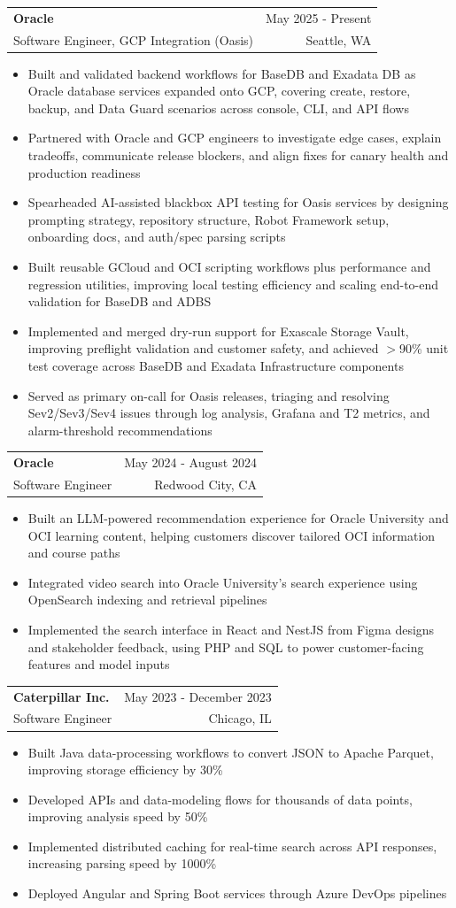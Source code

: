 \documentclass[letterpaper,11pt]{article}
\makeatletter
\newcommand{\resumeItem}[1]{
  \item\small{
    {#1 \vspace{-2pt}}
  }
}
\newcommand{\resumeSubheading}[4]{
  \vspace{-2pt}\item
    \begin{tabular*}{0.97\textwidth}[t]{l@{\extracolsep{\fill}}r}
      \textbf{#1} & #2 \\
      {\small#3} & {\small #4} \\
    \end{tabular*}\vspace{-7pt}
}
\newcommand{\resumeItemListStart}{\begin{itemize}}
\newcommand{\resumeItemListEnd}{\end{itemize}\vspace{-5pt}}
\makeatother
\begin{document}
    \resumeSubheading
  {Oracle}{May 2025 - Present}
  {Software Engineer, GCP Integration (Oasis)}{Seattle, WA}
  \resumeItemListStart
    \resumeItem{Built and validated backend workflows for BaseDB and Exadata DB as Oracle database services expanded onto GCP, covering create, restore, backup, and Data Guard scenarios across console, CLI, and API flows}
    \resumeItem{Partnered with Oracle and GCP engineers to investigate edge cases, explain tradeoffs, communicate release blockers, and align fixes for canary health and production readiness}
    \resumeItem{Spearheaded AI-assisted blackbox API testing for Oasis services by designing prompting strategy, repository structure, Robot Framework setup, onboarding docs, and auth/spec parsing scripts}
    \resumeItem{Built reusable GCloud and OCI scripting workflows plus performance and regression utilities, improving local testing efficiency and scaling end-to-end validation for BaseDB and ADBS}
    \resumeItem{Implemented and merged dry-run support for Exascale Storage Vault, improving preflight validation and customer safety, and achieved $>$90\% unit test coverage across BaseDB and Exadata Infrastructure components}
    \resumeItem{Served as primary on-call for Oasis releases, triaging and resolving Sev2/Sev3/Sev4 issues through log analysis, Grafana and T2 metrics, and alarm-threshold recommendations}
  \resumeItemListEnd

    \resumeSubheading
      {Oracle}{May 2024 - August 2024}
      {Software Engineer}{Redwood City, CA}
      \resumeItemListStart
        \resumeItem{Built an LLM-powered recommendation experience for Oracle University and OCI learning content, helping customers discover tailored OCI information and course paths}
        \resumeItem{Integrated video search into Oracle University's search experience using OpenSearch indexing and retrieval pipelines}
        \resumeItem{Implemented the search interface in React and NestJS from Figma designs and stakeholder feedback, using PHP and SQL to power customer-facing features and model inputs}
      \resumeItemListEnd

    \resumeSubheading
      {Caterpillar Inc.}{May 2023 - December 2023}
      {Software Engineer}{Chicago, IL}
      \resumeItemListStart
        \resumeItem{Built Java data-processing workflows to convert JSON to Apache Parquet, improving storage efficiency by 30\%}
        \resumeItem{Developed APIs and data-modeling flows for thousands of data points, improving analysis speed by 50\%}
        \resumeItem{Implemented distributed caching for real-time search across API responses, increasing parsing speed by 1000\%}
        \resumeItem{Deployed Angular and Spring Boot services through Azure DevOps pipelines}
      \resumeItemListEnd
\end{document}
